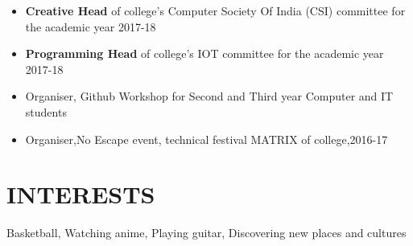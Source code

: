 \documentclass[11pt]{article} %
\newcommand{\NewPart}[1]{\section*{\uppercase{#1}}}
\begin{document}
\begin{itemize}
\itemsep-0.5em 
\item \textbf{Creative Head} of college’s Computer Society Of India (CSI) committee for the academic year 2017-18
\item \textbf{Programming Head} of college’s IOT committee for the academic year 2017-18
\item Organiser, Github Workshop for Second and Third year Computer and IT students 
\item Organiser,No Escape event, technical festival MATRIX of college,2016-17 
\end{itemize}

\NewPart{ Interests}{}
Basketball, Watching anime, Playing guitar, Discovering new places and cultures
\end{document}
